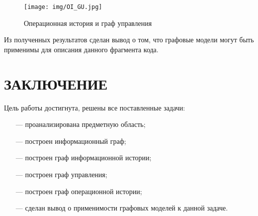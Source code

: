 \documentclass{bmstu}
\begin{document}
\begin{figure}[h]
	\centering
        \vspace{0pt}
	\texttt{[image: img/OI\_GU.jpg]}
	\caption{Операционная история и граф управления}
 \vspace*{3in}
	\label{fig:OI_GU}
\end{figure}

Из полученных результатов сделан вывод о том, что графовые модели могут быть применимы для описания данного фрагмента кода.

\chapter*{ЗАКЛЮЧЕНИЕ}
Цель работы достигнута, решены все поставленные задачи:
\begin{itemize}
	\item[---] проанализирована предметную область;
	\item[---] построен информационный граф;
	\item[---] построен граф информационной истории;
        \item[---] построен граф управления;
        \item[---] построен граф операционной истории;
        \item[---] сделан вывод о применимости графовых моделей к данной задаче.
\end{itemize}
\end{document}
